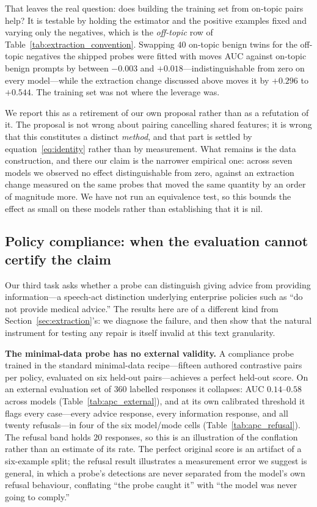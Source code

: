 That leaves the real question: does building the training set from on-topic pairs help? It is testable by holding the
estimator and the positive examples fixed and varying only the negatives, which is the \emph{off-topic} row of
Table~\ref{tab:extraction_convention}. Swapping $40$ on-topic benign twins for the off-topic negatives the shipped
probes were fitted with moves AUC against on-topic benign prompts by between $-0.003$ and $+0.018$---indistinguishable
from zero on every model---while the extraction change discussed above moves it by $+0.296$ to $+0.544$. The training
set was not where the leverage was.

We report this as a retirement of our own proposal rather than as a refutation of it. The proposal is not wrong about pairing cancelling shared
features; it is wrong that this constitutes a distinct \emph{method}, and that part is settled by
equation~\eqref{eq:identity} rather than by measurement. What remains is the data construction, and there our claim is
the narrower empirical one: across seven models we observed no effect distinguishable from zero, against an extraction
change measured on the same probes that moved the same quantity by an order of magnitude more. We have not run an
equivalence test, so this bounds the effect as small on these models rather than establishing that it is nil.

\subsection{Policy compliance: when the evaluation cannot certify the claim}
\label{sec:apc}

Our third task asks whether a probe can distinguish giving advice from providing information---a speech-act
distinction underlying enterprise policies such as ``do not provide medical advice.'' The results here are of a
different kind from Section~\ref{sec:extraction}'s: we diagnose the failure, and then show that the natural instrument
for testing any repair is itself invalid at this text granularity.

\textbf{The minimal-data probe has no external validity.} A compliance probe trained in the standard minimal-data
recipe---fifteen authored contrastive pairs per policy, evaluated on six held-out pairs---achieves
a perfect held-out score. On an external evaluation set of $360$ labelled responses it collapses: AUC $0.14$--$0.58$
across models (Table~\ref{tab:apc_external}), and at its own calibrated threshold it flags every case---every advice
response, every information response, and all twenty refusals---in four of the six model/mode cells
(Table~\ref{tab:apc_refusal}). The refusal band holds $20$ responses, so this is an illustration of the conflation
rather than an estimate of its rate. The perfect original score is an artifact of a six-example split; the refusal result
illustrates a measurement error we suggest is general, in which a probe's detections are never separated from the
model's own refusal behaviour, conflating ``the probe caught it'' with ``the model was never going to comply.''

